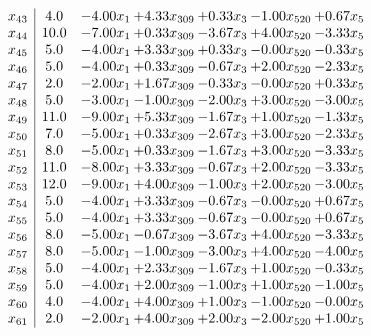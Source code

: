 \documentclass[8pt]{article}
\begin{document}
\[\begin{array}{c| c c@{\hskip 2pt} c@{\hskip 2pt} c@{\hskip 2pt} c@{\hskip 2pt} c@{\hskip 2pt} }
 x_{43}   &  4.0 & -4.00 x_{1} & +  4.33 x_{309} & +  0.33 x_{3} & -1.00 x_{520} & +  0.67 x_{5}\\
 x_{44}   &  10.0 & -7.00 x_{1} & +  0.33 x_{309} & -3.67 x_{3} & +  4.00 x_{520} & -3.33 x_{5}\\
 x_{45}   &  5.0 & -4.00 x_{1} & +  3.33 x_{309} & +  0.33 x_{3} & -0.00 x_{520} & -0.33 x_{5}\\
 x_{46}   &  5.0 & -4.00 x_{1} & +  0.33 x_{309} & -0.67 x_{3} & +  2.00 x_{520} & -2.33 x_{5}\\
 x_{47}   &  2.0 & -2.00 x_{1} & +  1.67 x_{309} & -0.33 x_{3} & -0.00 x_{520} & +  0.33 x_{5}\\
 x_{48}   &  5.0 & -3.00 x_{1} & -1.00 x_{309} & -2.00 x_{3} & +  3.00 x_{520} & -3.00 x_{5}\\
 x_{49}   &  11.0 & -9.00 x_{1} & +  5.33 x_{309} & -1.67 x_{3} & +  1.00 x_{520} & -1.33 x_{5}\\
 x_{50}   &  7.0 & -5.00 x_{1} & +  0.33 x_{309} & -2.67 x_{3} & +  3.00 x_{520} & -2.33 x_{5}\\
 x_{51}   &  8.0 & -5.00 x_{1} & +  0.33 x_{309} & -1.67 x_{3} & +  3.00 x_{520} & -3.33 x_{5}\\
 x_{52}   &  11.0 & -8.00 x_{1} & +  3.33 x_{309} & -0.67 x_{3} & +  2.00 x_{520} & -3.33 x_{5}\\
 x_{53}   &  12.0 & -9.00 x_{1} & +  4.00 x_{309} & -1.00 x_{3} & +  2.00 x_{520} & -3.00 x_{5}\\
 x_{54}   &  5.0 & -4.00 x_{1} & +  3.33 x_{309} & -0.67 x_{3} & -0.00 x_{520} & +  0.67 x_{5}\\
 x_{55}   &  5.0 & -4.00 x_{1} & +  3.33 x_{309} & -0.67 x_{3} & -0.00 x_{520} & +  0.67 x_{5}\\
 x_{56}   &  8.0 & -5.00 x_{1} & -0.67 x_{309} & -3.67 x_{3} & +  4.00 x_{520} & -3.33 x_{5}\\
 x_{57}   &  8.0 & -5.00 x_{1} & -1.00 x_{309} & -3.00 x_{3} & +  4.00 x_{520} & -4.00 x_{5}\\
 x_{58}   &  5.0 & -4.00 x_{1} & +  2.33 x_{309} & -1.67 x_{3} & +  1.00 x_{520} & -0.33 x_{5}\\
 x_{59}   &  5.0 & -4.00 x_{1} & +  2.00 x_{309} & -1.00 x_{3} & +  1.00 x_{520} & -1.00 x_{5}\\
 x_{60}   &  4.0 & -4.00 x_{1} & +  4.00 x_{309} & +  1.00 x_{3} & -1.00 x_{520} & -0.00 x_{5}\\
 x_{61}   &  2.0 & -2.00 x_{1} & +  4.00 x_{309} & +  2.00 x_{3} & -2.00 x_{520} & +  1.00 x_{5}\\

\end{array}\]
\end{document}
